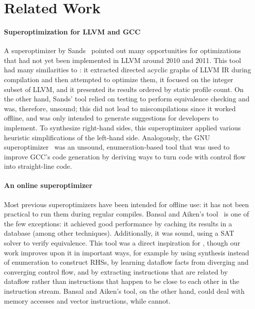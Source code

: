 \section{Related Work}
\label{sec:related}


\paragraph{Superoptimization for LLVM and GCC}
%
A superoptimizer by Sands~\cite{Sands11} pointed out many opportunities
for optimizations that had not yet been implemented in LLVM around 2010
and 2011.
%
This tool had many similarities to \tool{}: it extracted directed
acyclic graphs of LLVM IR during compilation and then attempted to
optimize them, it focused on the integer subset of LLVM, and it
presented its results ordered by static profile count.
%
On the other hand, Sands' tool relied on testing to perform
equivalence checking and was, therefore, unsound; this did not lead to
miscompilations since it worked offline, and was only intended to
generate suggestions for developers to implement.
%
To synthesize right-hand sides, this superoptimizer applied various
heuristic simplifications of the left-hand side.
%
Analogously, the GNU superoptimizer~\cite{Granlund92} was an unsound,
enumeration-based tool that was used to improve GCC's code generation
by deriving ways to turn code with control flow into straight-line
code.


\paragraph{An online superoptimizer}
%
Most previous superoptimizers have been intended for offline use: it
has not been practical to run them during regular compiles.
%
Bansal and Aiken's tool~\cite{Bansal06} is one of the few exceptions:
it achieved good performance by caching its results in a database
(among other techniques).
%
Additionally, it was sound, using a SAT solver to verify equivalence.
%
This tool was a direct inspiration for \tool{}, though our work
improves upon it in important ways, for example by using synthesis
instead of enumeration to construct RHSs, by learning dataflow facts
from diverging and converging control flow, and by extracting
instructions that are related by dataflow rather than instructions
that happen to be close to each other in the instruction stream.
%
Bansal and Aiken's tool, on the other hand, could deal with memory
accesses and vector instructions, while \tool{} cannot.


